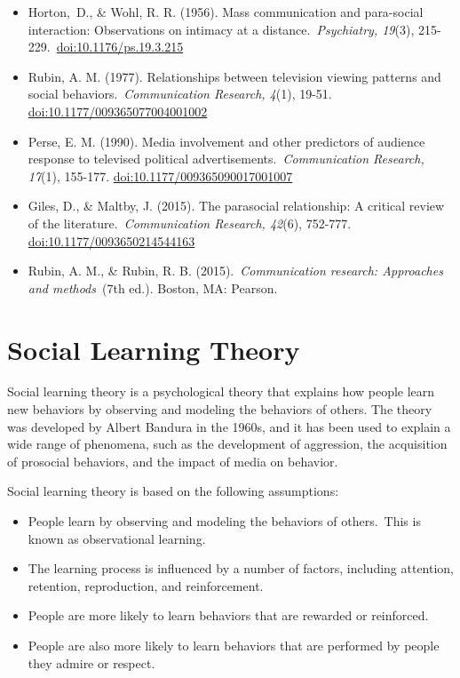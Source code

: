 \documentclass[
  b5paper]{book}
\begin{document}
\begin{itemize}
\item
  Horton,~D., \& Wohl, R. R. (1956). Mass communication and para-social interaction: Observations on intimacy at a distance.~\emph{Psychiatry, 19}(3), 215-229.~\url{doi:10.1176/ps.19.3.215}
\item
  Rubin, A. M. (1977). Relationships between television viewing patterns and social behaviors.~\emph{Communication Research, 4}(1), 19-51. \url{doi:10.1177/009365077004001002}
\item
  Perse, E. M. (1990). Media involvement and other predictors of audience response to televised political advertisements.~\emph{Communication Research, 17}(1), 155-177. \url{doi:10.1177/009365090017001007}
\item
  Giles, D., \& Maltby, J. (2015). The parasocial relationship: A critical review of the literature.~\emph{Communication Research, 42}(6), 752-777. \url{doi:10.1177/0093650214544163}
\item
  Rubin, A. M., \& Rubin, R. B. (2015).~\emph{Communication research: Approaches and methods}~(7th ed.). Boston, MA: Pearson.
\end{itemize}

\hypertarget{social-learning-theory}{%
\section{Social Learning Theory}\label{social-learning-theory}}

Social learning theory is a psychological theory that explains how people learn new behaviors by observing and modeling the behaviors of others. The theory was developed by Albert Bandura in the 1960s, and it has been used to explain a wide range of phenomena, such as the development of aggression, the acquisition of prosocial behaviors, and the impact of media on behavior.

Social learning theory is based on the following assumptions:

\begin{itemize}
\item
  People learn by observing and modeling the behaviors of others.~This is known as observational learning.
\item
  The learning process is influenced by a number of factors, including attention, retention, reproduction, and reinforcement.
\item
  People are more likely to learn behaviors that are rewarded or reinforced.
\item
  People are also more likely to learn behaviors that are performed by people they admire or respect.
\end{itemize}
\end{document}

